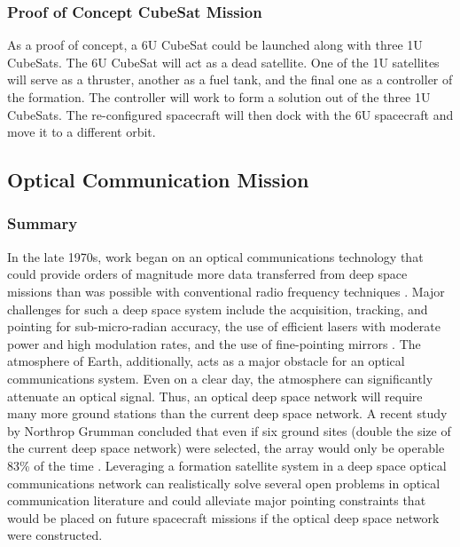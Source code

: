 \subsubsection{Proof of Concept CubeSat Mission}
As a proof of concept, a 6U CubeSat could be launched along with three 1U CubeSats. The 6U CubeSat will act as a dead satellite. One of the 1U satellites will serve as a thruster, another as a fuel tank, and the final one as a controller of the formation. The controller will work to form a solution out of the three 1U CubeSats. The re-configured spacecraft will then dock with the 6U spacecraft and move it to a different orbit.


\subsection{Optical Communication Mission}
\label{op_comm}
\subsubsection{Summary}
In the late 1970s, work began on an optical communications technology that could provide orders of magnitude more data transferred from deep space missions than was possible with conventional radio frequency techniques \cite{Hemmati}. Major challenges for such a deep space system include the acquisition, tracking, and pointing for sub-micro-radian accuracy, the use of efficient lasers with moderate power and high modulation rates, and the use of fine-pointing mirrors \cite{FlightRD}. The atmosphere of Earth, additionally, acts as a major obstacle for an optical communications system. Even on a clear day, the atmosphere can significantly attenuate an optical signal. Thus, an optical deep space network will require many more ground stations than the current deep space network. A recent study by Northrop Grumman concluded that even if six ground sites (double the size of the current deep space network) were selected, the array would only be operable 83\% of the time \cite{Wojcik}. Leveraging a formation satellite system in a deep space optical communications network can realistically solve several open problems in optical communication literature and could alleviate major pointing constraints that would be placed on future spacecraft missions if the optical deep space network were constructed.

